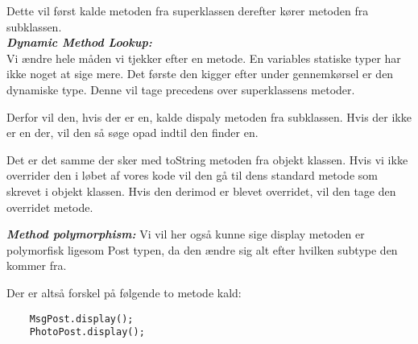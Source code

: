 \documentclass[a4paper,12pt]{article}
\newcommand{\textbfit}[1]{\textbf{\textit{#1}}}
\begin{document}
Dette vil først kalde metoden fra superklassen derefter kører metoden fra subklassen. \\

\textbfit{Dynamic Method Lookup:} \\
Vi ændre hele måden vi tjekker efter en metode. En variables statiske typer har ikke noget at sige mere. Det første den kigger efter under gennemkørsel er den dynamiske type. Denne vil tage precedens over superklassens metoder. 

Derfor vil den, hvis der er en, kalde dispaly metoden fra subklassen. Hvis der ikke er en der, vil den så søge opad indtil den finder en.

Det er det samme der sker med toString metoden fra objekt klassen. Hvis vi ikke overrider den i løbet af vores kode vil den gå til dens standard metode som skrevet i objekt klassen. Hvis den derimod er blevet overridet, vil den tage den overridet metode.

\textbfit{Method polymorphism:}
Vi vil her også kunne sige display metoden er polymorfisk ligesom Post typen, da den ændre sig alt efter hvilken subtype den kommer fra.

Der er altså forskel på følgende to metode kald:
\begin{verbatim}
    MsgPost.display();
    PhotoPost.display();
\end{verbatim}
\end{document}
